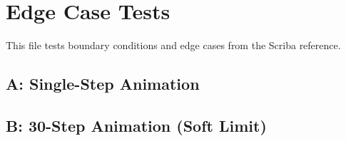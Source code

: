 \section{Edge Case Tests}

This file tests boundary conditions and edge cases from the Scriba reference.

\subsection{A: Single-Step Animation}

\begin{animation}[id="edge-a-single-step", label="Minimum 1-step animation"]

\step
{}
\end{animation}

\subsection{B: 30-Step Animation (Soft Limit)}

